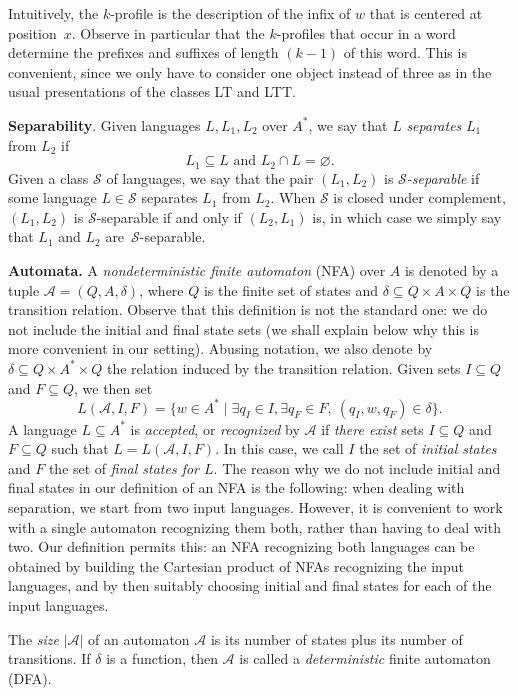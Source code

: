\documentclass{LMCS}
\newcommand\As{\ensuremath{\mathcal{A}}\xspace}
\newcommand{\lt}{\textup{LT}\xspace}
\newcommand{\ltt}{\textup{LTT}\xspace}
\newcommand\profile[1]{$#1$-profile\xspace}
\newcommand\profiles[1]{$#1$-profiles\xspace}
\newcommand\kprofile{\profile{k}}
\newcommand\kprofiles{\profiles{k}}
\newcommand\Sep{\ensuremath{\mathcal{S}}\xspace}
\theoremstyle{plain}
\begin{document}
Intuitively, the \kprofile is the description of the infix of $w$ that
is centered at position~$x$. Observe in particular that the \kprofiles
that occur in a word determine the prefixes and suffixes of length
$(k-1)$ of this word. This is convenient, since we only have to consider
one object instead of three as in the usual presentations of the classes
\lt and \ltt.

\smallskip
\noindent
{\textbf{Separability}.}
Given languages $L,L_1,L_2$ over $A^*$, we say that $L$ \emph{separates} $L_1$
from $L_2$ if 
\[
L_1 \subseteq L \text{ and } L_2 \cap L = \varnothing.
\]
Given a class \Sep of languages, we say that the pair $(L_1,L_2)$ is
\emph{\Sep-separable} if some language $L\in\Sep$ separates $L_1$ from
$L_2$. When \Sep is closed under complement,
$(L_1,L_2)$ is \Sep-separable if and only if $(L_2,L_1)$ is, in which
case we simply say that $L_1$ and $L_2$ are~\Sep-separable.


\smallskip
\noindent
{\textbf{Automata.}}
\label{paragraph:automata}
A \emph{nondeterministic finite automaton} (NFA) over $A$ is denoted by a
tuple $\mathcal{A}=(Q,A,\delta)$, where $Q$ is the finite set of states and
$\delta\subseteq Q\times A\times Q$ is the transition relation.  Observe that this definition
is not the standard one: we do not include the initial and final state
sets (we shall explain below why this is more convenient in our setting).
Abusing notation, we also denote by $\delta\subseteq Q\times A^*\times Q$ the
relation induced by the transition relation.  Given sets $I \subseteq Q$ and
$F\subseteq Q$, we then set
\[
L(\As,I,F) = \{w\in A^* \mid \exists q_I \in I, \exists q_F \in F,\  (q_I,w,q_F)\in \delta\}.
\]
A language $L \subseteq A^*$ is \emph{accepted}, or \emph{recognized}
by $\mathcal{A}$ if \emph{there exist}  sets $I \subseteq Q$ and $F\subseteq
Q$ such that $L=L(\As,I,F)$. In this case,
we call $I$ the set of \emph{initial states} and $F$ the set of \emph{final states for $L$}.
The reason why we do not include initial and final states in our definition of
an NFA is the following: when dealing with separation, we start from two input
languages. However, it is convenient to work with a single automaton
recognizing them both, rather than having to deal with two.  Our definition
permits this: an NFA recognizing both languages can be obtained by building
the Cartesian product of NFAs recognizing the input languages, and by then suitably
choosing initial and final states for each of the input languages.

The \emph{size} $|\mathcal{A}|$ of an automaton $\mathcal{A}$ is its number of states plus its number of
transitions. If $\delta$ is a function, then $\mathcal{A}$ is called a
\emph{deterministic} finite automaton (DFA). 
\end{document}
